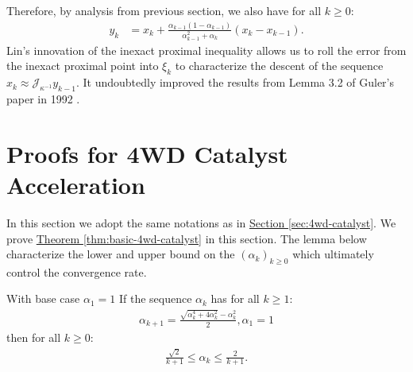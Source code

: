 \documentclass[12pt]{article}
\begin{document}
\begin{remark}
            Therefore, by analysis from previous section, we also have for all $k \ge 0$: 
            \begin{align*}
                y_k &= x_k + \frac{\alpha_{k - 1}(1 - \alpha_{k - 1})}{\alpha_{k - 1}^2 + \alpha_k}
                (x_k - x_{k - 1}).
            \end{align*}
            Lin's innovation of the inexact proximal inequality allows us to roll the error from the inexact proximal point into $\xi_k$ to characterize the descent of the sequence $x_k \approx \mathcal J_{\kappa^{-1}}y_{k - 1}$. 
            It undoubtedly improved the results from Lemma 3.2 of Guler's paper in 1992 \cite{guler_new_1992}. 
        \end{remark}

\section{Proofs for 4WD Catalyst Acceleration}\label{app:sec:ncnvx-catalyst}
    In this section we adopt the same notations as in 
    \hyperref[sec:4wd-catalyst]{Section \ref*{sec:4wd-catalyst}}. 
    We prove
    \hyperref[thm:basic-4wd-catalyst]{Theorem \ref*{thm:basic-4wd-catalyst}}
    in this section. 
    The lemma below characterize the lower and upper bound on the $(\alpha_k)_{k \ge 0}$ which ultimately control the convergence rate. 
    \begin{lemma}\label{app:lemma:momentum-sequence-bounds}
        With base case $\alpha_1 = 1$
        If the sequence $\alpha_k$ has for all $k\ge 1$: 
        \begin{align*}
            \alpha_{k + 1} = \frac{\sqrt{\alpha_k^4 + 4\alpha_k^2} - \alpha_k^2}{2}, \alpha_1 = 1
        \end{align*}
        then for all $k \ge0$: 
        \begin{align*}
            \frac{\sqrt{2}}{k + 1} \le \alpha_k \le \frac{2}{k + 1}. 
        \end{align*}
    \end{lemma}
\end{document}
